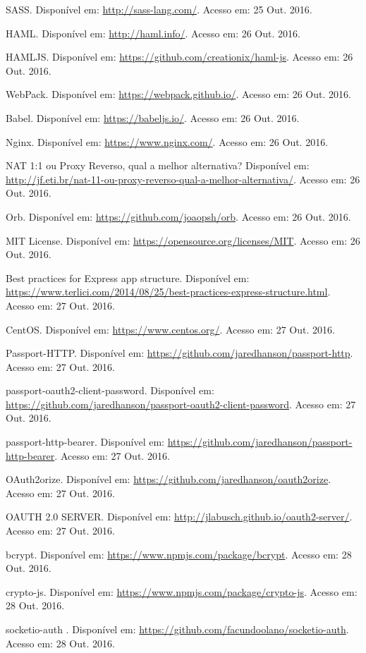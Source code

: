 \documentclass[brazil,ruledheader]{abntifes}
\begin{document}
\begin{thebibliography}{9}
		SASS. Disponível em: \url{http://sass-lang.com/}.
		Acesso em: 25 Out. 2016.
		
		HAML. Disponível em: \url{http://haml.info/}.
		Acesso em: 26 Out. 2016.
		
		HAMLJS. Disponível em: \url{https://github.com/creationix/haml-js}.
		Acesso em: 26 Out. 2016.
		
		WebPack. Disponível em: \url{https://webpack.github.io/}.
		Acesso em: 26 Out. 2016.
		
		Babel. Disponível em: \url{https://babeljs.io/}.
		Acesso em: 26 Out. 2016.
		
		Nginx. Disponível em: \url{https://www.nginx.com/}.
		Acesso em: 26 Out. 2016.
		
		NAT 1:1 ou Proxy Reverso, qual a melhor alternativa? Disponível em: \url{http://jf.eti.br/nat-11-ou-proxy-reverso-qual-a-melhor-alternativa/}.
		Acesso em: 26 Out. 2016.
		
		Orb. Disponível em: \url{https://github.com/joaopsh/orb}.
		Acesso em: 26 Out. 2016.
		
		MIT License. Disponível em: \url{https://opensource.org/licenses/MIT}.
		Acesso em: 26 Out. 2016.
		
		Best practices for Express app structure. Disponível em: \url{https://www.terlici.com/2014/08/25/best-practices-express-structure.html}.
		Acesso em: 27 Out. 2016.
		
		CentOS. Disponível em: \url{https://www.centos.org/}.
		Acesso em: 27 Out. 2016.
		
		Passport-HTTP. Disponível em: \url{https://github.com/jaredhanson/passport-http}.
		Acesso em: 27 Out. 2016.
		
		passport-oauth2-client-password. Disponível em: \url{https://github.com/jaredhanson/passport-oauth2-client-password}.
		Acesso em: 27 Out. 2016.
		
		passport-http-bearer. Disponível em: \url{https://github.com/jaredhanson/passport-http-bearer}.
		Acesso em: 27 Out. 2016.
		
		OAuth2orize. Disponível em: \url{https://github.com/jaredhanson/oauth2orize}.
		Acesso em: 27 Out. 2016.
		
		OAUTH 2.0 SERVER. Disponível em: \url{http://jlabusch.github.io/oauth2-server/}.
		Acesso em: 27 Out. 2016.
		
		bcrypt. Disponível em: \url{https://www.npmjs.com/package/bcrypt}.
		Acesso em: 28 Out. 2016.
		
		crypto-js. Disponível em: \url{https://www.npmjs.com/package/crypto-js}.
		Acesso em: 28 Out. 2016.
		
		
		socketio-auth . Disponível em: \url{https://github.com/facundoolano/socketio-auth}.
		Acesso em: 28 Out. 2016.
	\end{thebibliography}
		\anexo
	
\end{document}
